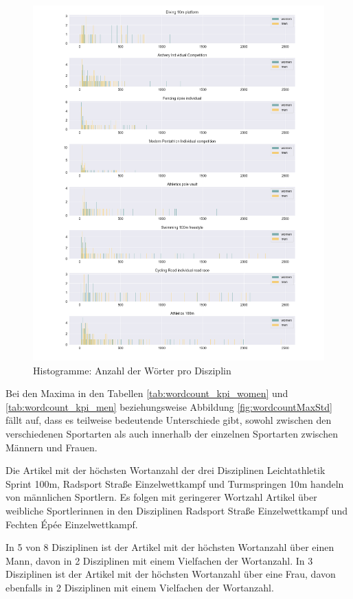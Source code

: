 \documentclass[11pt]{article}
\begin{document}
\begin{figure}
\includegraphics[width=1\textwidth]{figures/wordcount_disciplines_histogram.png}
\caption[Histogramme: Anzahl der Wörter pro Disziplin]{Histogramme: Anzahl der Wörter pro Disziplin}
\label{fig:wordcountDisciplinesHistogram}
\end{figure}

Bei den Maxima in den Tabellen \ref{tab:wordcount_kpi_women} und \ref{tab:wordcount_kpi_men} beziehungsweise Abbildung \ref{fig:wordcountMaxStd} fällt auf, dass es teilweise bedeutende Unterschiede gibt, sowohl zwischen den verschiedenen Sportarten als auch innerhalb der einzelnen Sportarten zwischen Männern und Frauen. 

Die Artikel mit der höchsten Wortanzahl der drei Disziplinen Leichtathletik Sprint 100m, Radsport Straße Einzelwettkampf und Turmspringen 10m handeln von männlichen Sportlern. Es folgen mit geringerer Wortzahl Artikel über weibliche Sportlerinnen in den Disziplinen Radsport Straße Einzelwettkampf und Fechten Épée Einzelwettkampf. 

In 5 von 8 Disziplinen ist der Artikel mit der höchsten Wortanzahl über einen Mann, davon in 2 Disziplinen mit einem Vielfachen der Wortanzahl.
In 3 Disziplinen ist der Artikel mit der höchsten Wortanzahl über eine Frau, davon ebenfalls in 2 Disziplinen mit einem Vielfachen der Wortanzahl. 
\end{document}
